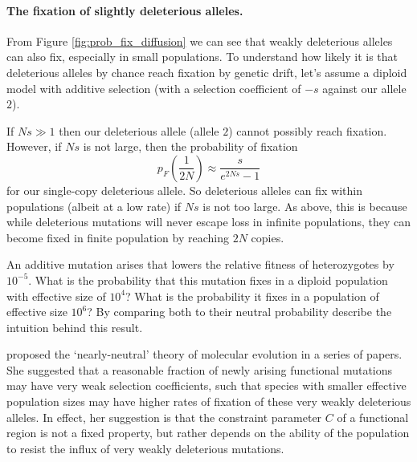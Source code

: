 {%

\paragraph{The fixation of slightly deleterious alleles.}
From Figure \ref{fig:prob_fix_diffusion} we can see that weakly
deleterious alleles can also fix, especially in small populations.  To understand how
likely it is that deleterious alleles by chance reach fixation by
genetic drift, let's assume a diploid model with additive selection (with
a selection coefficient of $-s$ against our allele $2$).  

If $N s \gg 1$ then our deleterious allele (allele $2$) cannot possibly reach
fixation. However, if $Ns$ is not large, then the probability of fixation
\begin{equation}
p_F \left( \frac{1}{2N} \right) \approx \frac{s}{e^{2Ns}-1} \label{eqn:fix_deleterious}
\end{equation}
for our single-copy deleterious allele. So deleterious alleles can fix within
populations (albeit at a low rate) if $Ns$ is not too large. As above,
this is because while deleterious mutations will never escape loss in
infinite populations, they can become fixed in finite population by
reaching $2N$ copies. 

\begin{question}
An additive mutation arises that lowers the relative fitness of heterozygotes by $10^{-5}$. What is the probability that this mutation fixes in a diploid population with effective size of $10^4$? What is the probability it fixes in a population of effective size $10^6$? By comparing both to their neutral probability describe the intuition behind this result.
\end{question}

\citeauthor{ohta1973slightly}
proposed the `nearly-neutral' theory of
molecular evolution in a series of papers\cite{ohta1972population,ohta1973slightly,ohta1987very}. She suggested that a reasonable fraction of newly
arising functional mutations may have very weak selection
coefficients, such that species with smaller effective population sizes may
have higher rates of fixation of these very weakly deleterious
alleles. In effect, her suggestion is that the constraint parameter
$C$ of a functional region is not a fixed property, but rather depends
on the ability of the population to resist the influx of very weakly
deleterious mutations. 

}
